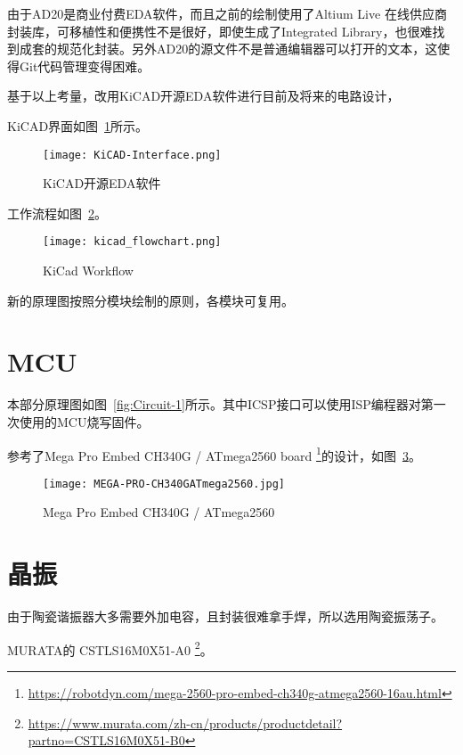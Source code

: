 由于AD20是商业付费EDA软件，而且之前的绘制使用了Altium Live 在线供应商封装库，可移植性和便携性不是很好，即使生成了Integrated Library，也很难找到成套的规范化封装。另外AD20的源文件不是普通编辑器可以打开的文本，这使得Git代码管理变得困难。

基于以上考量，改用KiCAD开源EDA软件进行目前及将来的电路设计，

KiCAD界面如图~\ref{fig:KiCAD-Interface}所示。

\begin{figure}[htbp]
    \centering
    \texttt{[image: KiCAD-Interface.png]}
    \caption{KiCAD开源EDA软件}
    \label{fig:KiCAD-Interface}
\end{figure}

工作流程如图~\ref{fig:kicad_flowchart}。

\begin{figure}[htbp]
    \centering
    \texttt{[image: kicad\_flowchart.png]}
    \caption{KiCad Workflow}
    \label{fig:kicad_flowchart}
\end{figure}

新的原理图按照分模块绘制的原则，各模块可复用。

\section{MCU}

本部分原理图如图~\ref{fig:Circuit-1}所示。其中ICSP接口可以使用ISP编程器对第一次使用的MCU烧写固件。

参考了Mega Pro Embed CH340G / ATmega2560 board \footnote{\url{https://robotdyn.com/mega-2560-pro-embed-ch340g-atmega2560-16au.html}}的设计，如图~\ref{fig:MEGA-PRO-CH340GATmega2560}。

\begin{figure}[htbp]
    \centering
    \texttt{[image: MEGA-PRO-CH340GATmega2560.jpg]}
    \caption{Mega Pro Embed CH340G / ATmega2560}
    \label{fig:MEGA-PRO-CH340GATmega2560}
\end{figure}


\section{晶振}

由于陶瓷谐振器大多需要外加电容，且封装很难拿手焊，所以选用陶瓷振荡子。

MURATA的 CSTLS16M0X51-A0 \footnote{\url{https://www.murata.com/zh-cn/products/productdetail?partno=CSTLS16M0X51-B0}}。

